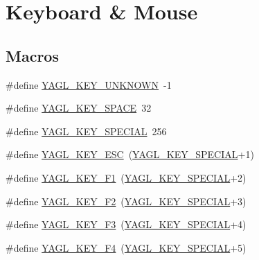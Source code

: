 \hypertarget{group____consts__key__mouse}{\section{Keyboard \& Mouse}
\label{group____consts__key__mouse}
}
\subsection*{Macros}
\begin{DoxyCompactItemize}
\item 
\#define \hyperlink{group____consts__key__mouse_ga625a87b55afd78734de152d4e80ed3e7}{Y\-A\-G\-L\-\_\-\-K\-E\-Y\-\_\-\-U\-N\-K\-N\-O\-W\-N}~-\/1
\item 
\#define \hyperlink{group____consts__key__mouse_ga6cdcfe7b849ffc004a48a31be3ded6aa}{Y\-A\-G\-L\-\_\-\-K\-E\-Y\-\_\-\-S\-P\-A\-C\-E}~32
\item 
\#define \hyperlink{group____consts__key__mouse_gae6060c5e0a8f15c67d28e1a1f0765d7b}{Y\-A\-G\-L\-\_\-\-K\-E\-Y\-\_\-\-S\-P\-E\-C\-I\-A\-L}~256
\item 
\#define \hyperlink{group____consts__key__mouse_ga3aae92ad70da0b5bb2d7a1fc0b6c33c9}{Y\-A\-G\-L\-\_\-\-K\-E\-Y\-\_\-\-E\-S\-C}~(\hyperlink{group____consts__key__mouse_gae6060c5e0a8f15c67d28e1a1f0765d7b}{Y\-A\-G\-L\-\_\-\-K\-E\-Y\-\_\-\-S\-P\-E\-C\-I\-A\-L}+1)
\item 
\#define \hyperlink{group____consts__key__mouse_gae90bc91ec94c007b571e482ef52f5b4c}{Y\-A\-G\-L\-\_\-\-K\-E\-Y\-\_\-\-F1}~(\hyperlink{group____consts__key__mouse_gae6060c5e0a8f15c67d28e1a1f0765d7b}{Y\-A\-G\-L\-\_\-\-K\-E\-Y\-\_\-\-S\-P\-E\-C\-I\-A\-L}+2)
\item 
\#define \hyperlink{group____consts__key__mouse_ga50dbc7fb7c11068c78054091c024dc31}{Y\-A\-G\-L\-\_\-\-K\-E\-Y\-\_\-\-F2}~(\hyperlink{group____consts__key__mouse_gae6060c5e0a8f15c67d28e1a1f0765d7b}{Y\-A\-G\-L\-\_\-\-K\-E\-Y\-\_\-\-S\-P\-E\-C\-I\-A\-L}+3)
\item 
\#define \hyperlink{group____consts__key__mouse_gab37172f02f4554a9c94a3588276b2ed5}{Y\-A\-G\-L\-\_\-\-K\-E\-Y\-\_\-\-F3}~(\hyperlink{group____consts__key__mouse_gae6060c5e0a8f15c67d28e1a1f0765d7b}{Y\-A\-G\-L\-\_\-\-K\-E\-Y\-\_\-\-S\-P\-E\-C\-I\-A\-L}+4)
\item 
\#define \hyperlink{group____consts__key__mouse_ga09ad59ef37eb78dd113a75a2630bd1d9}{Y\-A\-G\-L\-\_\-\-K\-E\-Y\-\_\-\-F4}~(\hyperlink{group____consts__key__mouse_gae6060c5e0a8f15c67d28e1a1f0765d7b}{Y\-A\-G\-L\-\_\-\-K\-E\-Y\-\_\-\-S\-P\-E\-C\-I\-A\-L}+5)

\end{DoxyCompactItemize}
